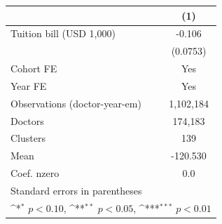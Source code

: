 {
\def\sym#1{\ifmmode^{#1}\else\(^{#1}\)\fi}
\begin{tabular}{l*{1}{c}}
\hline\hline
                    &\multicolumn{1}{c}{(1)}         \\
\hline
Tuition bill (USD 1,000)&      -0.106         \\
                    &    (0.0753)         \\
[1em]
Cohort FE           &         Yes         \\
[1em]
Year FE             &         Yes         \\
\hline
Observations (doctor-year-em)&   1,102,184         \\
Doctors             &     174,183         \\
Clusters            &         139         \\
Mean                &    -120.530         \\
Coef. %
nzero               &         0.0         \\
\hline\hline
\multicolumn{2}{l}{\footnotesize Standard errors in parentheses}\\
\multicolumn{2}{l}{\footnotesize \sym{*} \(p<0.10\), \sym{**} \(p<0.05\), \sym{***} \(p<0.01\)}\\
\end{tabular}
}
